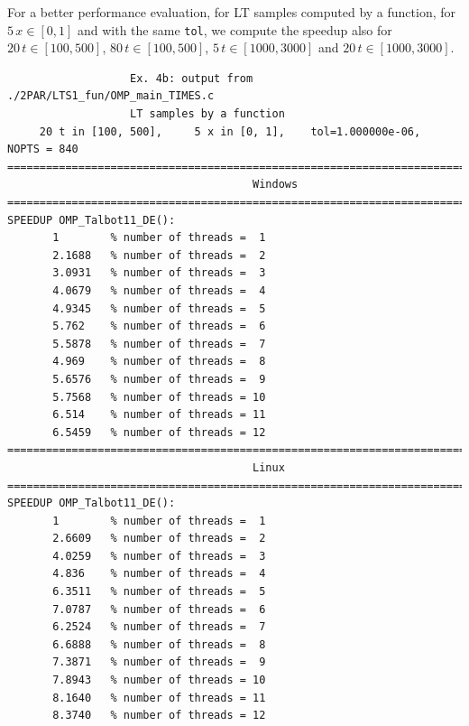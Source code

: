 \documentclass[a4paper,10pt]{report}%
\begin{document}
\noindent For a better performance evaluation, for LT samples computed by a function, for $5\,x\in[0,1]$
and with the same {\tt tol}, we compute the speedup also for $20\,t\in[100,500]$,  $80\,t\in[100,500]$,
$5\,t\in[1000,3000]$ and $20\,t\in[1000,3000]$.
\begin{lstlisting}
                   Ex. 4b: output from ./2PAR/LTS1_fun/OMP_main_TIMES.c
                   LT samples by a function
     20 t in [100, 500],     5 x in [0, 1],    tol=1.000000e-06,    NOPTS = 840
====================================================================================
                                      Windows
====================================================================================
SPEEDUP OMP_Talbot11_DE():
       1        % number of threads =  1
       2.1688   % number of threads =  2
       3.0931   % number of threads =  3
       4.0679   % number of threads =  4
       4.9345   % number of threads =  5
       5.762    % number of threads =  6
       5.5878   % number of threads =  7
       4.969    % number of threads =  8
       5.6576   % number of threads =  9
       5.7568   % number of threads = 10
       6.514    % number of threads = 11
       6.5459   % number of threads = 12
====================================================================================
                                      Linux
====================================================================================
SPEEDUP OMP_Talbot11_DE():
       1        % number of threads =  1
       2.6609   % number of threads =  2
       4.0259   % number of threads =  3
       4.836    % number of threads =  4
       6.3511   % number of threads =  5
       7.0787   % number of threads =  6
       6.2524   % number of threads =  7
       6.6888   % number of threads =  8
       7.3871   % number of threads =  9
       7.8943   % number of threads = 10
       8.1640   % number of threads = 11
       8.3740   % number of threads = 12


\end{lstlisting}
\end{document}
